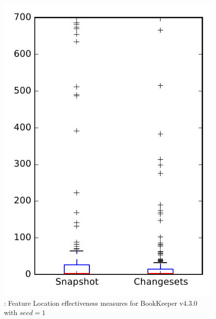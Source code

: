 
\begin{figure}
\centering
\includegraphics[height=0.4\textheight]{figures/flt_seed/rq1_bookkeeper_1}
\caption{\rone: Feature Location effectiveness measures for BookKeeper v4.3.0 with $seed=1$}
\label{fig:flt_seed:rq1:bookkeeper}
\end{figure}
